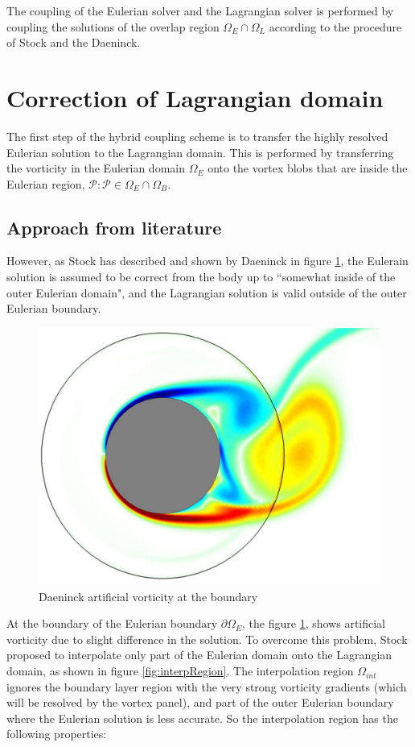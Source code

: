 The coupling of the Eulerian solver and the Lagrangian solver is performed by coupling the solutions of the overlap region $\Omega_E \cap \Omega_L$ according to the procedure of Stock and the Daeninck.

\section{Correction of Lagrangian domain}

The first step of the hybrid coupling scheme is to transfer the highly resolved Eulerian solution to the Lagrangian domain. This is performed by transferring the vorticity in the Eulerian domain $\Omega_E$ onto the vortex blobs that are inside the Eulerian region, $\mathcal{P}: \mathcal{P} \in \Omega_E \cap \Omega_B$.
				
\subsection*{Approach from literature}		
							
However, as Stock has described \cite{} and shown by Daeninck in figure \ref{fig:daeninck_CylinderVorticity}, the Eulerain solution is assumed to be correct from the body up to ``somewhat inside of the outer Eulerian domain", and the Lagrangian solution is valid outside of the outer Eulerian boundary. 

	\begin{figure}[h]
	\centering
	\includegraphics[width=0.5\linewidth]{./figures/hybrid/daeninck_CylinderVorticity.png}
	\caption{Daeninck artificial vorticity at the boundary}
	\label{fig:daeninck_CylinderVorticity}
	\end{figure}

At the boundary of the Eulerian boundary $\partial \Omega_E$, the figure \ref{}, shows artificial vorticity due to slight difference in the solution. To overcome this problem, Stock proposed to interpolate only part of the Eulerian domain onto the Lagrangian domain, as shown in figure \ref{fig:interpRegion}. The interpolation region $\Omega_{int}$ ignores the boundary layer region with the very strong vorticity gradients (which will be resolved by the vortex panel), and part of the outer Eulerian boundary where the Eulerian solution is less accurate. So the interpolation region has the following properties:

